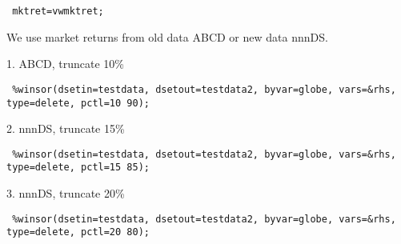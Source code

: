 

\usepackage[T1]{fontenc}




\thispagestyle{fancy}

\newcommand{\code}{\texttt}
\newcommand*{\Commonpath}{20190315}

\code{
	mktret=vwmktret; \\
}

We use market returns from old data ABCD or new data nnnDS.

1. ABCD, truncate 10\%

\code{	
\%winsor(dsetin=testdata, dsetout=testdata2, byvar=globe, vars=\&rhs, type=delete, pctl=10 90);
}




2. nnnDS, truncate 15\%

\code{	
\%winsor(dsetin=testdata, dsetout=testdata2, byvar=globe, vars=\&rhs, type=delete, pctl=15 85);
}




3. nnnDS, truncate 20\%

\code{	
\%winsor(dsetin=testdata, dsetout=testdata2, byvar=globe, vars=\&rhs, type=delete, pctl=20 80);
}







